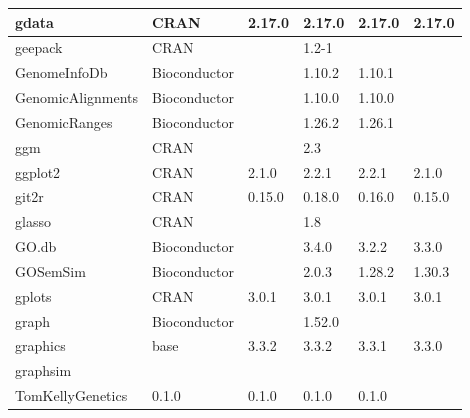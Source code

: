 \begin{longtable}{|llllll|}
gdata                         & CRAN                      & 2.17.0      & 2.17.0      & 2.17.0         & 2.17.0           \\ \hline
geepack                       & CRAN                      &             & 1.2-1       &                &                   \\ \hline \rowcolor{gray!25}
GenomeInfoDb                  & Bioconductor              &             & 1.10.2      & 1.10.1         &                  \\ \hline
GenomicAlignments             & Bioconductor              &             & 1.10.0      & 1.10.0         &                   \\ \hline \rowcolor{gray!25}
GenomicRanges                 & Bioconductor              &             & 1.26.2      & 1.26.1         &                  \\ \hline
ggm                           & CRAN                      &             & 2.3         &                &                   \\ \hline \rowcolor{gray!25}
ggplot2                       & CRAN                      & 2.1.0       & 2.2.1       & 2.2.1          & 2.1.0            \\ \hline
git2r                         & CRAN                      & 0.15.0      & 0.18.0      & 0.16.0         & 0.15.0            \\ \hline \rowcolor{gray!25}
glasso                        & CRAN                      &             & 1.8         &                &                  \\ \hline
GO.db                         & Bioconductor              &             & 3.4.0       & 3.2.2          & 3.3.0             \\ \hline \rowcolor{gray!25}
GOSemSim                      & Bioconductor              &             & 2.0.3       & 1.28.2         & 1.30.3           \\ \hline
gplots                        & CRAN                      & 3.0.1       & 3.0.1       & 3.0.1          & 3.0.1             \\ \hline \rowcolor{gray!25}
graph                         & Bioconductor              &             & 1.52.0      &                &                  \\ \hline
graphics                      & base                      & 3.3.2       & 3.3.2       & 3.3.1          & 3.3.0             \\ \hline \rowcolor{gray!25}
graphsim                      & \begin{tabular}[c]{@{}l@{}}GitHub \\ TomKellyGenetics \end{tabular}  & 0.1.0       & 0.1.0       & 0.1.0          & 0.1.0            \\ \hline

\end{longtable}
